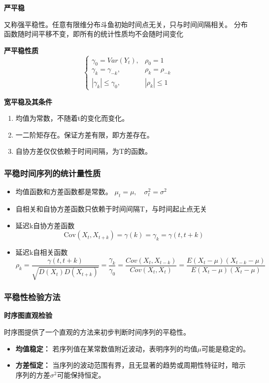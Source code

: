 \documentclass{article} %
\begin{document}
\textbf{严平稳}

又称强平稳性。任意有限维分布斗鱼初始时间点无关，只与时间间隔相关。
分布函数随时间平移不变，即所有的统计性质均不会随时间变化

\textbf{严平稳性质}
\[
\begin{cases}
\gamma_0=Var(Y_t), & \rho_0=1 \\
\gamma_k=\gamma_{-k}, & \rho_k=\rho_{-k} \\
|\gamma_k|\leq\gamma_0, & |\rho_k|\leq 1
\end{cases}
\]

\textbf{宽平稳及其条件}

\begin{enumerate}
  \item 均值为常数，不随着t的变化而变化。
\item 一二阶矩存在。保证方差有限，即方差存在。  
\item 自协方差仅仅依赖于时间间隔，为T的函数。 
\end{enumerate}



\subsubsection{平稳时间序列的统计量性质}

\begin{itemize}
    \item 均值函数和方差函数都是常数。    \(\mu_t=\mu,\quad \sigma_t^2=\sigma^2\)
    \item 自相关和自协方差函数只依赖于时间间隔T，与时间起止点无关
          \item 延迟k自协方差函数
            \[
              \text{Cov}(X_t,X_{t+k})=\gamma(k)=\gamma_k=\gamma(t,t+k)
            \]
          \item 延迟k自相关函数
            \[
            \rho_k=\frac{\gamma(t,t+k)}{\sqrt{D(X_t)D(X_{t+k})}}=\frac{\gamma_k}{\gamma_0}=\frac{Cov(X_t,X_{t-k})}{Cov(X_t,X_t)}=\frac{E(X_t-\mu)(X_{t-k}-\mu)}{E(X_t-\mu)(X_t-\mu)}
            \]
      \end{itemize}

      \subsubsection{平稳性检验方法}

      \textbf{时序图直观检验}

      时序图提供了一个直观的方法来初步判断时间序列的平稳性。
      \begin{itemize}
          \item \textbf{均值稳定：} 若序列值在某常数值附近波动，表明序列的均值\(\mu\)可能是稳定的。
          \item \textbf{方差恒定：} 当序列的波动范围有界，且无显著的趋势或周期性特征时，暗示序列的方差\(\sigma^2\)可能保持恒定。
      \end{itemize}
      
\end{document}
